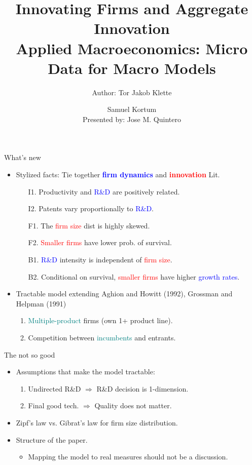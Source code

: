 \documentclass[usenames,dvipsnames,aspectratio=169]{beamer}
\title{Innovating Firms and Aggregate Innovation  \\ \small{Applied Macroeconomics: Micro Data for Macro Models} }
\author{Author: Tor Jakob Klette \and Samuel Kortum \\ 
Presented by: Jose M. Quintero}
\begin{document}
\begin{frame}
  \titlepage
\end{frame}

\begin{frame}{What's new}
\begin{itemize}
    \item Stylized facts: Tie together \textcolor{blue}{\textbf{firm dynamics}} and \textcolor{red}{\textbf{innovation}} Lit. 
    \begin{enumerate}
        \item[I1.] Productivity and \textcolor{blue}{R\&D} are positively related.  
        \item[I2.] Patents vary proportionally to \textcolor{blue}{R\&D}. 
        \item[F1.] The \textcolor{red}{firm size} dist is highly skewed.
        \item[F2.] \textcolor{red}{Smaller firms} have lower prob. of survival.
        \item[B1.] \textcolor{blue}{R\&D} intensity is independent of \textcolor{red}{firm size}. 
        \item[B2.] Conditional on survival, \textcolor{red}{smaller firms} have higher \textcolor{blue}{growth rates}. 
    \end{enumerate}
    \vfill
    \item Tractable model extending Aghion and Howitt (1992), Grossman and Helpman (1991)
    \begin{enumerate}
        \item \textcolor{teal}{Multiple-product} firms (own 1+ product line).
        \item Competition between \textcolor{teal}{incumbents} and entrants. 
    \end{enumerate}
\end{itemize}
\end{frame}

\begin{frame}{The not so good}
     \begin{itemize}
         \item Assumptions that make the model tractable:
         \begin{enumerate}
             \item Undirected R\&D $\Longrightarrow$ R\&D decision is 1-dimension.  
             \item Final good tech. $\Longrightarrow$ Quality does not matter. 
         \end{enumerate}
         \item Zipf's law vs. Gibrat's law for firm size distribution. 
         \item Structure of the paper. 
         \begin{itemize}
             \item Mapping the model to real measures should not be a discussion. 
         \end{itemize}
     \end{itemize}
\end{frame}
\end{document}
